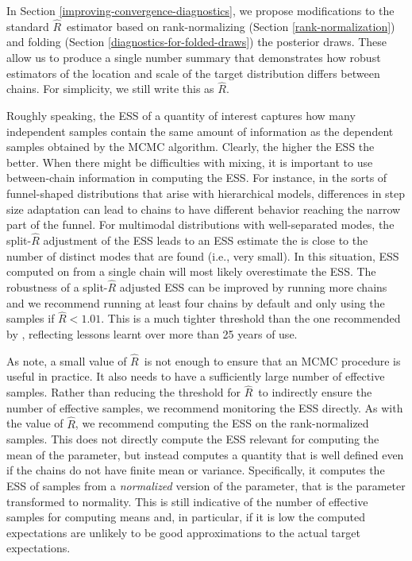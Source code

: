\documentclass[american,]{article}
\newcommand{\Rhat}{$\widehat{R}$}
\theoremstyle{definition}
\begin{document}
In Section \ref{improving-convergence-diagnostics}, we propose modifications to the 
standard \Rhat\ estimator based on rank-normalizing (Section 
\ref{rank-normalization}) and folding (Section
 \ref{diagnostics-for-folded-draws}) the posterior draws.
These allow us to produce a single number summary  that demonstrates how
 robust estimators of the location and scale of the target distribution differs
 between chains.  For simplicity, we still write this as \Rhat .
 
Roughly speaking, the ESS of a quantity of interest captures how many 
independent samples contain the same amount of information as the dependent 
samples obtained by the MCMC algorithm. Clearly, the higher the ESS the better.
When there might be difficulties with mixing, it is important to use between-chain 
information in computing the ESS. For instance, in the sorts of
funnel-shaped distributions that arise with hierarchical models, differences 
in step size adaptation can lead to chains to have
different behavior reaching the narrow part of the funnel. For multimodal 
distributions with well-separated modes, the split-\(\widehat{R}\)
adjustment of the ESS leads to an ESS estimate the is close to the number of
distinct modes that are found (i.e., very small). 
In this situation, ESS computed on from a single chain will most likely 
overestimate the ESS. The robustness of a split-\(\widehat{R}\) adjusted
ESS can be improved by running more chains and we recommend running at least 
four chains by default and only using the samples if  $\widehat{R} < 1.01$. 
This is a much tighter threshold than the one recommended by 
\citet{Gelman+Rubin:1992}, reflecting lessons learnt over more than 25 years of use.

As \citet{vats2018revisiting} note, a small value of \Rhat\ is not enough to ensure 
that an MCMC procedure is useful in practice. It also needs to have a sufficiently
large number of effective samples. Rather than reducing the threshold for \Rhat\
to indirectly ensure the number of effective samples, we recommend monitoring
the ESS directly. As with the value of \Rhat, we 
recommend computing the ESS on the rank-normalized samples. This does not
directly compute the ESS relevant for computing the mean of the parameter, but 
instead computes a quantity that is well defined even if the chains do not 
have finite mean or variance.  Specifically, it computes the ESS of samples 
from a \emph{normalized} version of the parameter, that is the parameter 
transformed to normality. This is still indicative of the number of effective 
samples for computing means and, in particular, if it is low the computed
expectations are unlikely to be good approximations to the actual
target expectations.  
\end{document}
